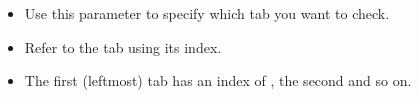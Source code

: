  \begin{itemize}
\item Use this parameter to specify which tab you want to check.
\item Refer to the tab using its index.
\item The first (leftmost) tab has an index of , the second  and so on.
\end{itemize}
   
